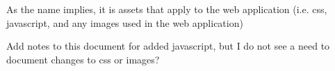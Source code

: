 As the name implies, it is assets that apply to the web application (i.\-e. css, javascript, and any images used in the web application)

Add notes to this document for added javascript, but I do not see a need to document changes to css or images? 